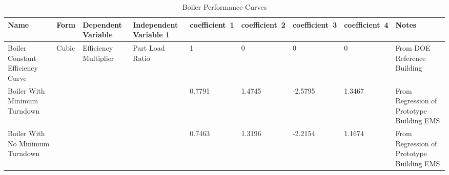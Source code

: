 \begin{table}
\scriptsize
\centering
\caption{Boiler Performance Curves}
\label{tab:boiler_plr_curve_table}
\begin{tabular}{|p{0.5in}|p{0.5in}|p{0.5in}|p{0.5in}|p{0.4in}|p{0.4in}|p{0.4in}|p{0.4in}|p{1in}|}
\hline
\textbf{Name} &
  \textbf{Form} &
  \textbf{Dependent Variable} &
  \textbf{Independent Variable 1} &
  \textbf{coefficient\ 1} &
  \textbf{coefficient\ 2} &
  \textbf{coefficient\ 3} &
  \textbf{coefficient\ 4} &
  \textbf{Notes} \\ \hline
Boiler Constant Efficiency Curve &
  \multirow{3}{*}{\parbox{1.5cm}{Cubic}} &
  \multirow{3}{*}{\parbox{1.5cm}{Efficiency Multiplier}} &
  \multirow{3}{*}{\parbox{1.5cm}{Part Load Ratio}} & 1 & 0 & 0 & 0 & From DOE Reference Building \\ \cline{1-1} \cline{5-9} 
Boiler With Minimum Turndown &  &  &  & 0.7791 & 1.4745 & -2.5795 & 1.3467 & From Regression of Prototype Building EMS \\ \cline{1-1} \cline{5-9} 
Boiler With No Minimum Turndown &  &  &  & 0.7463 & 1.3196 & -2.2154 & 1.1674 & From Regression of Prototype Building EMS \\ \hline
\end{tabular}
\end{table}